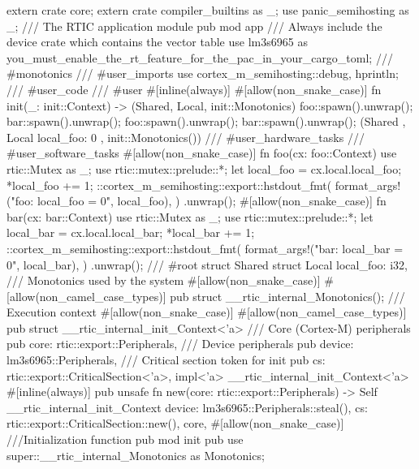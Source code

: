 extern crate core;
extern crate compiler_builtins as _;
use panic_semihosting as _;
/// The RTIC application module
pub mod app {
    /// Always include the device crate which contains the vector table
    use lm3s6965 as you_must_enable_the_rt_feature_for_the_pac_in_your_cargo_toml;
    /// #monotonics
    /// #user_imports
    use cortex_m_semihosting::{debug, hprintln};
    /// #user_code
    /// #user
    #[inline(always)]
    #[allow(non_snake_case)]
    fn init(_: init::Context) -> (Shared, Local, init::Monotonics) {
        foo::spawn().unwrap();
        bar::spawn().unwrap();
        foo::spawn().unwrap();
        bar::spawn().unwrap();
        (Shared {}, Local { local_foo: 0 }, init::Monotonics())
    }
    /// #user_hardware_tasks
    /// #user_software_tasks
    #[allow(non_snake_case)]
    fn foo(cx: foo::Context) {
        use rtic::Mutex as _;
        use rtic::mutex::prelude::*;
        let local_foo = cx.local.local_foo;
        *local_foo += 1;
        ::cortex_m_semihosting::export::hstdout_fmt(
                format_args!("foo: local_foo = {0}\n", local_foo),
            )
            .unwrap();
    }
    #[allow(non_snake_case)]
    fn bar(cx: bar::Context) {
        use rtic::Mutex as _;
        use rtic::mutex::prelude::*;
        let local_bar = cx.local.local_bar;
        *local_bar += 1;
        ::cortex_m_semihosting::export::hstdout_fmt(
                format_args!("bar: local_bar = {0}\n", local_bar),
            )
            .unwrap();
    }
    /// #root
    struct Shared {}
    struct Local {
        local_foo: i32,
    }
    /// Monotonics used by the system
    #[allow(non_snake_case)]
    #[allow(non_camel_case_types)]
    pub struct __rtic_internal_Monotonics();
    /// Execution context
    #[allow(non_snake_case)]
    #[allow(non_camel_case_types)]
    pub struct __rtic_internal_init_Context<'a> {
        /// Core (Cortex-M) peripherals
        pub core: rtic::export::Peripherals,
        /// Device peripherals
        pub device: lm3s6965::Peripherals,
        /// Critical section token for init
        pub cs: rtic::export::CriticalSection<'a>,
    }
    impl<'a> __rtic_internal_init_Context<'a> {
        #[inline(always)]
        pub unsafe fn new(core: rtic::export::Peripherals) -> Self {
            __rtic_internal_init_Context {
                device: lm3s6965::Peripherals::steal(),
                cs: rtic::export::CriticalSection::new(),
                core,
            }
        }
    }
    #[allow(non_snake_case)]
    ///Initialization function
    pub mod init {
        pub use super::__rtic_internal_Monotonics as Monotonics;
}}
